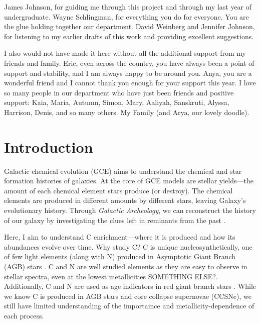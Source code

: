 \documentclass[12pt,oneside]{report}
\begin{document}
James Johnson, for guiding me through this project and through my last year of undergraduate.
Wayne Schlingman, for everything you do for everyone. You are the glue holding together our department.
David Weinberg and Jennifer Johnson, for listening to my earlier drafts of this work and providing excellent suggestions.

I also would not have made it here without all the additional support from my friends and family. Eric, even across the country, you have always been a point of support and stability, and I am always happy to be around you. Anya, you are a wonderful friend and I cannot thank you enough for your support this year. 
I love so many people in our department who have just been friends and positive support: Kaia, Maria, Autumn, Simon, Mary, Aaliyah, Sanskruti, Alyssa, Harrison, Denis, and so many others. 
My Family (and Arya, our lovely doodle).


\tableofcontents
\listoffigures
\listoftables
\newpage
{}



\chapter{Introduction}

Galactic chemical evolution (GCE) aims to understand the chemical and star formation histories of galaxies. At the core of GCE models are stellar yields---the amount of each chemical element stars produce (or destroy). The chemical elements are produced in different amounts by different stars, leaving Galaxy's evolutionary history. Through \textit{Galactic Archeology}, we can reconstruct the history of our galaxy by investigating the clues left in reminants from the past \citep{Weinberg+22, emily+19}.

Here, I aim to understand C enrichment---where it is produced and how its abundances evolve over time. Why study C? C is unique nucleosynthetically, one of few light elements (along with N) produced in Asymptotic Giant Branch (AGB) stars \citep[e.g.][]{jennifer19, KL14}. C and N are well studied elements as they are easy to observe in stellar spectra, even at the lowest metallicities \citep{FN15} SOMETHING ELSE?. Additionally, C and N are used as age indicators in red giant branch stars \citep[e.g.][]{martig16, MG15, fiorenzo+21}.
While we know C is produced in AGB stars and core collapse supernovae (CCSNe), we still have limited understanding of the importaince and metallicity-dependence of each process.
\end{document}

